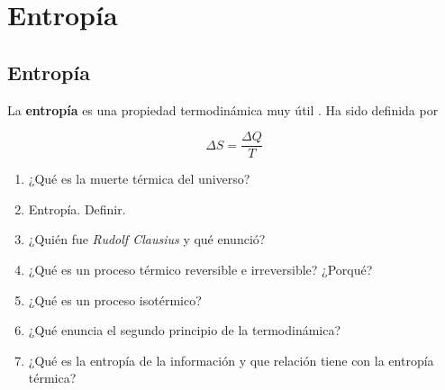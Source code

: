 \documentclass[../main]{subfiles}
\begin{document}
\chapter{Entropía}


\section{Entropía}

La \textbf{entropía} es una propiedad termodinámica muy útil . Ha sido definida por 


\begin{equation}
    \Delta S  =\dfrac{\Delta Q}{T} 
\end{equation}


\begin{enumerate}
    \item ¿Qué es la muerte térmica del universo?
    \item Entropía. Definir.
    \item ¿Quién fue \emph{Rudolf Clausius} y qué enunció?
    \item ¿Qué es un proceso térmico reversible e irreversible? ¿Porqué?
    \item ¿Qué es un proceso isotérmico?
    \item ¿Qué enuncia el segundo principio de la termodinámica?
    \item ¿Qué es la entropía de la información y que relación tiene con la entropía térmica?
\end{enumerate}
\end{document}
